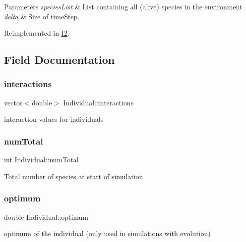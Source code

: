 \begin{DoxyParams}{Parameters}
{\em species\+List} & List containing all (alive) species in the environment \\
\hline
{\em delta} & Size of time\+Step. \\
\hline
\end{DoxyParams}


Reimplemented in \hyperlink{classI2_ac747249e352a954b96a530537c60d3b1}{I2}.



\subsection{Field Documentation}
\mbox{\label{classIndividual_ac832077568d1e59f979af3fe6bd7e3e6}} 
\subsubsection{\texorpdfstring{interactions}{interactions}}
{\footnotesize\ttfamily vector$<$double$>$ Individual\+::interactions}

interaction values for individuals \mbox{\label{classIndividual_a78e6327a339aa73f73d81e991b3fede2}} 
\subsubsection{\texorpdfstring{num\+Total}{numTotal}}
{\footnotesize\ttfamily int Individual\+::num\+Total}

Total number of species at start of simulation \mbox{\label{classIndividual_adc6dbb93690c48fbba745ce0fcf6d5b0}} 
\subsubsection{\texorpdfstring{optimum}{optimum}}
{\footnotesize\ttfamily double Individual\+::optimum}

optimum of the individual (only used in simulations with evolution) \mbox{\label{classIndividual_a2a7068df27211ad0b2e869a3c628cd9f}} 
